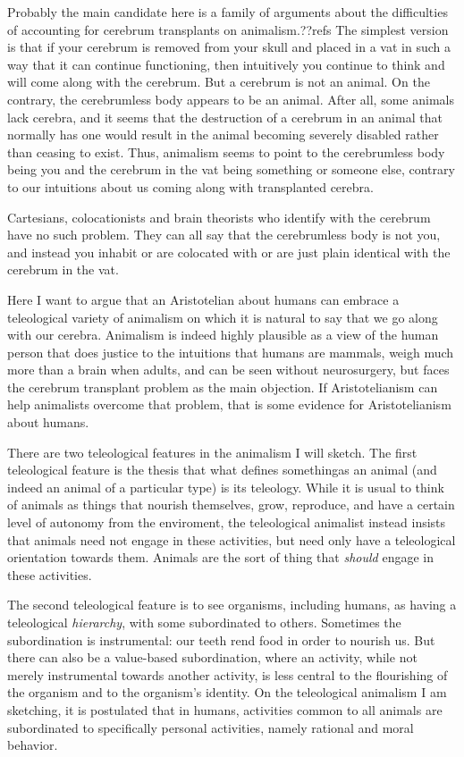 Probably the main candidate here is a family of arguments about the difficulties of accounting for cerebrum transplants
on animalism.??refs The simplest version is that if your cerebrum is removed from your skull and placed in a vat in such a way
that it can continue functioning, then intuitively you continue to think and will come along with the cerebrum. But a cerebrum
is not an animal. On the contrary, the cerebrumless body appears to be an animal. After all, some animals lack
cerebra, and it seems that the destruction of a cerebrum in an animal that normally has one would result in the animal 
becoming severely disabled rather than ceasing to exist. Thus, animalism seems to point to the cerebrumless body being you and 
the cerebrum in the vat being something or someone else, contrary to our intuitions about us coming along with 
transplanted cerebra.

Cartesians, colocationists and brain theorists who identify with the cerebrum have no such problem. They can all say that
the cerebrumless body is not you, and instead you inhabit or are colocated with or are just plain identical with the cerebrum
in the vat. 

Here I want to argue that an Aristotelian about humans can embrace a teleological variety of animalism on which it is natural to say that 
we go along with our cerebra. Animalism is indeed highly plausible as 
a view of the human person that does justice to the intuitions that humans are mammals, weigh much more than a brain 
when adults, and can be seen without neurosurgery, but faces the cerebrum transplant problem as the main objection. 
If Aristotelianism can help animalists overcome that problem, that is some evidence for Aristotelianism about humans.

There are two teleological features in the animalism I will sketch. The first teleological feature is the thesis 
that what defines somethingas an animal (and indeed an animal of a particular type) is its teleology. While it is usual to 
think of animals as things that nourish themselves, grow, reproduce, and have a certain level of autonomy from the enviroment, 
the teleological animalist instead insists that animals need not engage in these activities, but need only have a teleological
orientation towards them. Animals are the sort of thing that \textit{should} engage in these activities. 

The second teleological feature is to see organisms, including humans, as having a teleological \textit{hierarchy}, with some
\tele{} subordinated to others. Sometimes the subordination is instrumental: our teeth rend food in order to nourish us. 
But there can also be a value-based subordination, where an activity, while not merely instrumental towards another activity, 
is less central to the flourishing of the organism and to the organism's identity. On the teleological animalism I am sketching,
it is postulated that in humans, activities common to all animals are subordinated to specifically personal activities, namely 
rational and moral behavior. 

